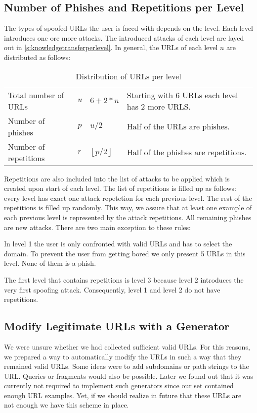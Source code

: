 \subsection{Number of Phishes and Repetitions per Level}
The types of spoofed URLs the user is faced with depends on the level.
Each level introduces one ore more attacks.
The introduced attacks of each level are layed out in \autoref{s:knowledgetransferperlevel}.
In general, the URLs of each level $n$ are distributed as follows:
\begin{table}[hHtbp]
\centering
\begin{tabular}{|llll|}
\hline
Total number of URLs&$u$&$6+2*n$&Starting with 6 URLs each level has 2 more URLS.\\
Number of phishes&$p$&$u/2$&Half of the URLs are phishes.\\
Number of repetitions&$r$&$\left\lfloor p/2 \right\rfloor$&Half of the phishes are repetitions.\\
\hline
\end{tabular}
\caption{Distribution of URLs per level}
\label{t:levelurls}
\end{table}
Repetitions are also included into the list of attacks to be applied which is created upon start of each level.
The list of repetitions is filled up as follows: every level has exact one attack repetetion for each previous level. The rest of the repetitions is filled up randomly. This way, we assure that at least one example of each previous level is represented by the attack repetitions. All remaining phishes are new attacks.
There are two main exception to these rules:
\begin{description}[leftmargin=0cm]
\item[Level 1:] In level 1 the user is only confronted with valid URLs and has to select the domain.
To prevent the user from getting bored we only present 5 URLs in this level.
None of them is a phish.
\item[Level 1+2:] The first level that contains repetitions is level 3 because level 2 introduces the very first spoofing attack. Consequently, level 1 and level 2 do not have repetitions.
\end{description}


\subsection{Modify Legitimate URLs with a Generator}
\label{s:apply_generator}
We were unsure whether we had collected sufficient valid URLs.
 For this reasons, we prepared a way to automatically modify the URLs in such a way that they remained valid URLs. 
Some ideas were to add subdomains or path strings to the URL. Queries or fragments would also  be possible. 
Later we found out that it was currently not required to implement such generators since our set contained enough URL examples. 
Yet, if we should realize in future that these URLs are not enough we have this scheme in place.
